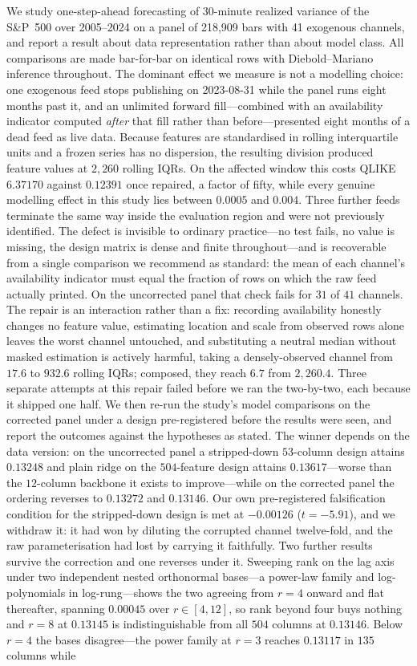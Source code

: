 We study one-step-ahead forecasting of 30-minute realized variance of the S\&P~500 over 2005--2024 on a panel of 218{,}909 bars with 41 exogenous channels, and report a result about data representation rather than about model class. All comparisons are made bar-for-bar on identical rows with Diebold--Mariano inference throughout. The dominant effect we measure is not a modelling choice: one exogenous feed stops publishing on 2023-08-31 while the panel runs eight months past it, and an unlimited forward fill---combined with an availability indicator computed \emph{after} that fill rather than before---presented eight months of a dead feed as live data. Because features are standardised in rolling interquartile units and a frozen series has no dispersion, the resulting division produced feature values at $2{,}260$ rolling IQRs. On the affected window this costs QLIKE $6.37170$ against $0.12391$ once repaired, a factor of fifty, while every genuine modelling effect in this study lies between $0.0005$ and $0.004$. Three further feeds terminate the same way inside the evaluation region and were not previously identified. The defect is invisible to ordinary practice---no test fails, no value is missing, the design matrix is dense and finite throughout---and is recoverable from a single comparison we recommend as standard: the mean of each channel's availability indicator must equal the fraction of rows on which the raw feed actually printed. On the uncorrected panel that check fails for $31$ of $41$ channels. The repair is an interaction rather than a fix: recording availability honestly changes no feature value, estimating location and scale from observed rows alone leaves the worst channel untouched, and substituting a neutral median without masked estimation is actively harmful, taking a densely-observed channel from $17.6$ to $932.6$ rolling IQRs; composed, they reach $6.7$ from $2{,}260.4$. Three separate attempts at this repair failed before we ran the two-by-two, each because it shipped one half. We then re-run the study's model comparisons on the corrected panel under a design pre-registered before the results were seen, and report the outcomes against the hypotheses as stated. The winner depends on the data version: on the uncorrected panel a stripped-down $53$-column design attains $0.13248$ and plain ridge on the $504$-feature design attains $0.13617$---worse than the $12$-column backbone it exists to improve---while on the corrected panel the ordering reverses to $0.13272$ and $0.13146$. Our own pre-registered falsification condition for the stripped-down design is met at $-0.00126$ ($t = -5.91$), and we withdraw it: it had won by diluting the corrupted channel twelve-fold, and the raw parameterisation had lost by carrying it faithfully. Two further results survive the correction and one reverses under it. Sweeping rank on the lag axis under two independent nested orthonormal bases---a power-law family and log-polynomials in log-rung---shows the two agreeing from $r = 4$ onward and flat thereafter, spanning $0.00045$ over $r \in [4, 12]$, so rank beyond four buys nothing and $r = 8$ at $0.13145$ is indistinguishable from all $504$ columns at $0.13146$. Below $r = 4$ the bases disagree---the power family at $r = 3$ reaches $0.13117$ in $135$ columns while 